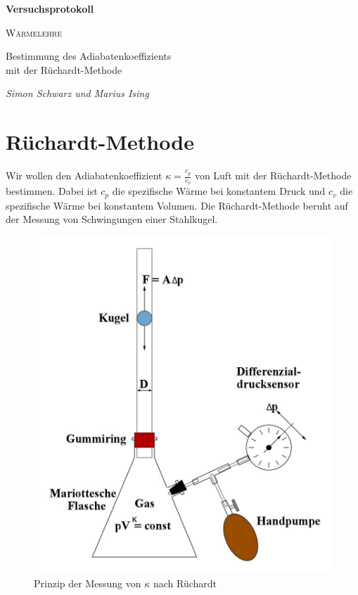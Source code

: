 \documentclass[a4paper, 12pt]{scrartcl}
\begin{document}
\begin{titlepage}
	\centering
	{\Huge\bfseries Versuchsprotokoll\par}
	\vspace{2cm}
	{\scshape\LARGE Wärmelehre \par}
	\vspace{1cm}
	{\Large Bestimmung des Adiabatenkoeffizients \\ mit der Rüchardt-Methode\par}
	\vfill
	{\large\itshape Simon Schwarz und Marius Ising\par}

	\vfill
\end{titlepage}

\tableofcontents
\newpage

\section{Rüchardt-Methode}

Wir wollen den Adiabatenkoeffizient $\kappa = \frac{c_p}{c_v}$ von Luft mit der Rüchardt-Methode bestimmen. Dabei ist $c_p$ die spezifische Wärme bei konstantem Druck und $c_v$ die spezifische Wärme bei konstantem Volumen. Die Rüchardt-Methode beruht auf der Messung von Schwingungen einer Stahlkugel.

\begin{figure}[H]
\centering
\includegraphics[width=.5\textwidth]{bilder/prinzipRuechardt.jpg}
\caption{Prinzip der Messung von $\kappa$ nach Rüchardt}
\end{figure}
\end{document}
